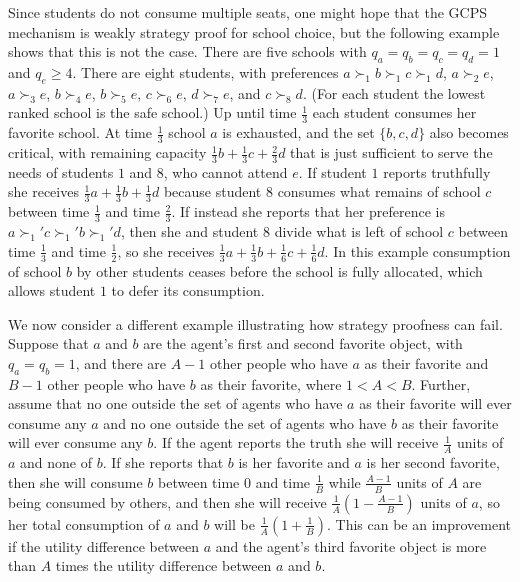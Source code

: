 \documentclass[12pt]{article}
\theoremstyle{definition}
\begin{document}
Since students do not consume multiple seats, one might hope that the GCPS mechanism is weakly strategy proof for school choice, but the following example shows that this is not the case.  There are five schools with $q_a = q_b = q_c = q_d = 1$ and $q_e \ge 4$.  There are eight students, with preferences $a \succ_1 b \succ_1 c \succ_1 d$, $a \succ_2 e$,  $a \succ_3 e$,  $b \succ_4 e$,   $b \succ_5 e$,   $c \succ_6 e$,  $d \succ_7 e$, and  $c \succ_8 d$.  (For each student the lowest ranked school is the safe school.)  Up until time $\tfrac13$ each student consumes her favorite school.  At time $\tfrac13$ school $a$ is exhausted, and the set $\{b,c,d\}$ also becomes critical, with remaining capacity $\tfrac13 b + \tfrac13 c + \tfrac23 d$ that is just sufficient to serve the needs of students $1$ and $8$, who cannot attend $e$.  If student $1$ reports truthfully she receives $\tfrac13 a + \tfrac13 b + \tfrac13 d$ because student $8$ consumes what remains of school $c$ between time $\tfrac13$ and time $\tfrac23$.  If instead she reports that her preference is $a \succ_1' c \succ_1' b \succ_1' d$, then she and student $8$ divide what is left of school $c$ between time $\tfrac13$ and time $\tfrac12$, so she receives $\tfrac13 a + \tfrac13 b + \tfrac16 c + \tfrac16 d$.  In this example consumption of school $b$ by other students ceases before the school is fully allocated, which allows student $1$ to defer its consumption.

We now consider a different example illustrating how strategy proofness can fail.  Suppose that $a$ and $b$ are the agent's first and second favorite object, with $q_a = q_b = 1$, and there are $A-1$ other people who have $a$ as their favorite and $B - 1$ other people who have $b$ as their favorite, where  $1 < A < B$.  Further, assume that no one outside the set of agents  who have $a$ as their favorite will ever consume any $a$ and no one outside the set of agents  who have $b$ as their favorite will ever consume any $b$.  If the agent reports the truth she will receive $\tfrac{1}{A}$ units of $a$ and none of $b$.  If she reports that $b$ is her favorite and $a$ is her second favorite, then she will consume $b$ between time $0$ and time $\tfrac{1}{B}$ while $\tfrac{A-1}{B}$ units of $A$ are being consumed by others, and then she will
receive $\tfrac{1}{A}(1 - \tfrac{A-1}{B})$ units of $a$, so her total consumption of $a$ and $b$ will be $\tfrac{1}{A}(1 + \tfrac{1}{B})$.  This can be an improvement if the utility difference between $a$ and the agent's third favorite object is more than $A$ times the utility difference between $a$ and $b$.
\end{document}
